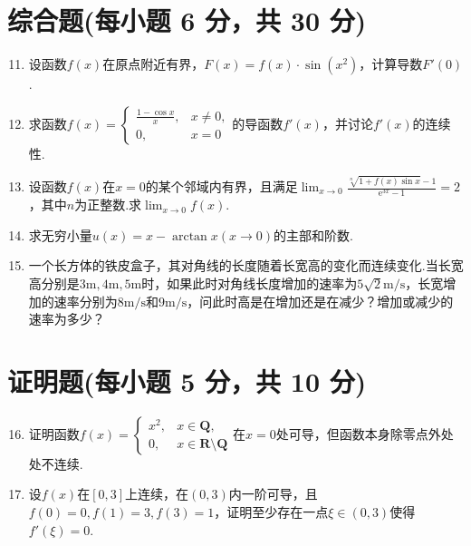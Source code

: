 \documentclass[../main.tex]{subfiles}
\begin{document}
\section{综合题(每小题 6 分，共 30 分)}
\begin{enumerate}
    \setcounter{enumi}{10}
    \item 设函数$f(x)$在原点附近有界，$F(x)=f(x)\cdot\sin\left(x^{2}\right)$，计算导数$F
              '(0)$.
          \vspace{8em}

    \item 求函数$f(x)=
              \begin{cases}
                  \frac{1-\cos x}{x}, & x\neq0, \\
                  0,                  & x=0
              \end{cases}$的导函数$f'(x)$，并讨论$f'(x)$的连续性.
          \vspace{8em}

    \item 设函数$f(x)$在$x=0$的某个邻域内有界，且满足$\lim_{x\to0}\frac{\sqrt[n]{1+f(x)\sin
                      x}-1}{\mathrm{e}^{3x}-1}=2$，其中$n$为正整数.求$\lim_{x\to0}f(x)$.
          \vspace{9em}

    \item 求无穷小量$u(x)=x-\arctan x(x\to0)$的主部和阶数.
          \vspace{10em}

    \item 一个长方体的铁皮盒子，其对角线的长度随着长宽高的变化而连续变化.当长宽高分别是$3
              \mathrm{m},4\mathrm{m},5\mathrm{m}$时，如果此时对角线长度增加的速率为$5\sqrt{2}
              \mathrm{m/s}$，长宽增加的速率分别为$8\mathrm{m/s}$和$9\mathrm{m/s}$，问此时高是在增加还是在减少？增加或减少的速率为多少？
          \vspace{12em}
\end{enumerate}

\section{证明题(每小题 5 分，共 10 分)}
\begin{enumerate}
    \setcounter{enumi}{15}
    \item 证明函数$f(x)=
              \begin{cases}
                  x^{2}, & x\in\mathbf{Q},                   \\
                  0,     & x\in\mathbf{R}\setminus\mathbf{Q}
              \end{cases}$在$x=0$处可导，但函数本身除零点外处处不连续.
          \vspace{12em}

    \item 设$f(x)$在$[0,3]$上连续，在$(0,3)$内一阶可导，且$f(0)=0,f(1)=3,f(3
              )=1$，证明至少存在一点$\xi\in(0,3)$使得$f'(\xi)=0$.
\end{enumerate}
\end{document}

